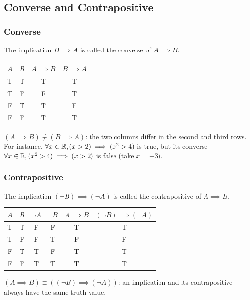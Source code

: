 \subsection{Converse and Contrapositive}
\subsubsection{Converse}
The implication $B \implies A$ is called the converse of $A \implies B$.
\begin{center}
    \begin{tabular}{c|c|c|c}
        $A$ & $B$ & $A \implies B$ & $B \implies A$ \\
        \hline
        T & T & T & T \\
        T & F & F & T \\
        F & T & T & F \\
        F & F & T & T
    \end{tabular}
\end{center}
\begin{remark}
    $(A \implies B) \not\equiv (B \implies A)$: the two columns differ in the second and third rows.
    For instance, $\forall x \in \mathbb{R}, (x > 2) \implies (x^2 > 4)$ is true, but its converse
    $\forall x \in \mathbb{R}, (x^2 > 4) \implies (x > 2)$ is false (take $x = -3$).
\end{remark}

\subsubsection{Contrapositive}
The implication $(\neg B) \implies (\neg A)$ is called the contrapositive of $A \implies B$.
\begin{center}
\begin{tabular}{c|c|c|c|c|c}
$A$ & $B$ & $\neg A$ & $\neg B$ & $A \implies B$ & $(\neg B) \implies (\neg A)$ \\
\hline
T & T & F & F & T & T \\
T & F & F & T & F & F \\
F & T & T & F & T & T \\
F & F & T & T & T & T
\end{tabular}
\end{center}

\begin{remark}
    $(A \implies B) \equiv ((\neg B) \implies (\neg A))$: an implication and its contrapositive
    always have the same truth value.
\end{remark}

